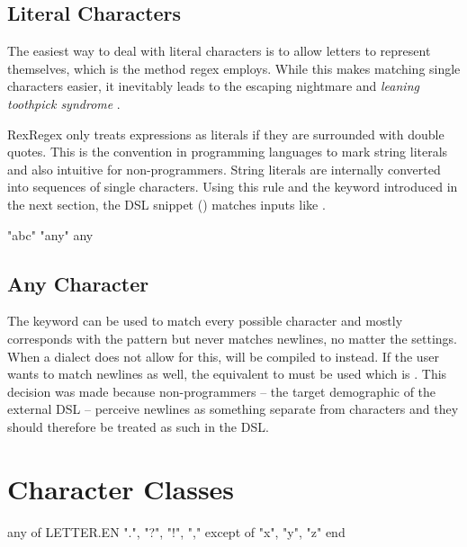 \subsection{Literal Characters}

The easiest way to deal with literal characters is to allow letters to represent themselves, which is the method regex employs. While this makes matching single characters easier, it inevitably leads to the escaping nightmare and \emph{leaning toothpick syndrome} \cite{LeaningToothpick}. 

RexRegex only treats expressions as literals if they are surrounded with double quotes. This is the convention in programming languages to mark string literals and also intuitive for non-programmers. String literals are internally converted into sequences of single characters. Using this rule and the  keyword introduced in the next section, the DSL snippet () matches inputs like .

\vspace{5mm}
\begin{rexregexBox}[title={Literal characters in External DSL},label=code:dslLiteralChars,width=10cm,center]
"abc"
"any"
any
\end{rexregexBox}

\subsection{Any Character}

The  keyword can be used to match every possible character and mostly corresponds with the  pattern but never matches newlines, no matter the settings. When a dialect does not allow for this,  will be compiled to \pattern{[\caret\bs n]} instead. If the user wants to match newlines as well, the equivalent to  must be used which is . This decision was made because non-programmers -- the target demographic of the external DSL -- perceive newlines as something separate from characters and they should therefore be treated as such in the DSL.

\section{Character Classes} \label{sec:dslCharClasses}

\begin{rexregexBox}[label=code:dslCharClasses,title=Character classes,width=10cm,center]
any of
    LETTER.EN
    ".", "?", "!", ","
except of
    "x", "y", "z"
end
\end{rexregexBox}

